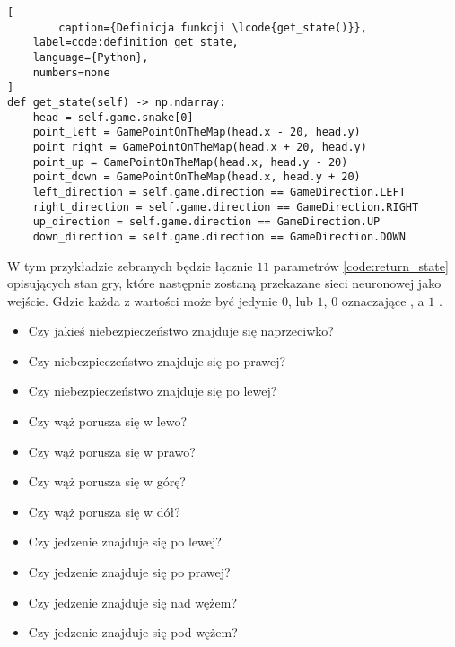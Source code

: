 \begin{onepage}
    \begin{lstlisting}[
        caption={Definicja funkcji \lcode{get_state()}},
    label=code:definition_get_state,
    language={Python},
    numbers=none
]
def get_state(self) -> np.ndarray:
    head = self.game.snake[0]
    point_left = GamePointOnTheMap(head.x - 20, head.y)
    point_right = GamePointOnTheMap(head.x + 20, head.y)
    point_up = GamePointOnTheMap(head.x, head.y - 20)
    point_down = GamePointOnTheMap(head.x, head.y + 20)
    left_direction = self.game.direction == GameDirection.LEFT
    right_direction = self.game.direction == GameDirection.RIGHT
    up_direction = self.game.direction == GameDirection.UP
    down_direction = self.game.direction == GameDirection.DOWN
    \end{lstlisting}
\end{onepage}

W tym przykładzie zebranych będzie łącznie $11$ parametrów \ref{code:return_state} opisujących stan gry, które następnie zostaną przekazane sieci neuronowej jako wejście. Gdzie każda z wartości może być jedynie $0$, lub $1$, $0$ oznaczające , a $1$ .

\begin{itemize}
    \item Czy jakieś niebezpieczeństwo znajduje się naprzeciwko?
    \item Czy niebezpieczeństwo znajduje się po prawej?
    \item Czy niebezpieczeństwo znajduje się po lewej?
    \item Czy wąż porusza się w lewo?
    \item Czy wąż porusza się w prawo?
    \item Czy wąż porusza się w górę?
    \item Czy wąż porusza się w dół?
    \item Czy jedzenie znajduje się po lewej?
    \item Czy jedzenie znajduje się po prawej?
    \item Czy jedzenie znajduje się nad wężem?
    \item Czy jedzenie znajduje się pod wężem?
\end{itemize}


